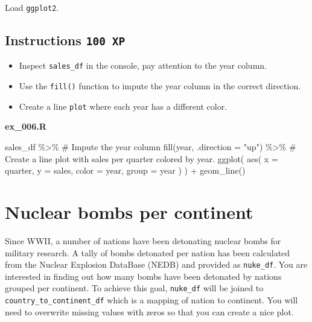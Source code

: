 \documentclass[
  letterpaper,
  DIV=11,
  numbers=noendperiod]{scrreprt}
\newenvironment{Shaded}{\begin{snugshade}}{\end{snugshade}}
\newcommand{\AttributeTok}[1]{\textcolor[rgb]{0.40,0.45,0.13}{#1}}
\newcommand{\CommentTok}[1]{\textcolor[rgb]{0.37,0.37,0.37}{#1}}
\newcommand{\FunctionTok}[1]{\textcolor[rgb]{0.28,0.35,0.67}{#1}}
\newcommand{\NormalTok}[1]{\textcolor[rgb]{0.00,0.23,0.31}{#1}}
\newcommand{\SpecialCharTok}[1]{\textcolor[rgb]{0.37,0.37,0.37}{#1}}
\newcommand{\StringTok}[1]{\textcolor[rgb]{0.13,0.47,0.30}{#1}}
\providecommand{\tightlist}{%
  \setlength{\itemsep}{0pt}\setlength{\parskip}{0pt}}\usepackage{longtable,booktabs,array}
\begin{document}
Load \texttt{ggplot2}.

\hypertarget{instructions-100-xp-5}{%
\subsection*{\texorpdfstring{Instructions
\texttt{100\ XP}}{Instructions 100 XP}}\label{instructions-100-xp-5}}

\begin{itemize}
\tightlist
\item
  Inspect \texttt{sales\_df} in the console, pay attention to the year
  column.
\item
  Use the \texttt{fill()} function to impute the year column in the
  correct direction.
\item
  Create a line \texttt{plot} where each year has a different color.
\end{itemize}

\textbf{ex\_006.R}

\begin{Shaded}
\begin{Highlighting}[]
\NormalTok{sales\_df }\SpecialCharTok{\%\textgreater{}\%} 
  \CommentTok{\# Impute the year column}
  \FunctionTok{fill}\NormalTok{(year, }\AttributeTok{.direction =} \StringTok{"up"}\NormalTok{) }\SpecialCharTok{\%\textgreater{}\%}
  \CommentTok{\# Create a line plot with sales per quarter colored by year.}
  \FunctionTok{ggplot}\NormalTok{(}
    \FunctionTok{aes}\NormalTok{(}
      \AttributeTok{x =}\NormalTok{ quarter,}
      \AttributeTok{y =}\NormalTok{ sales,}
      \AttributeTok{color =}\NormalTok{ year,}
      \AttributeTok{group =}\NormalTok{ year}
\NormalTok{    )}
\NormalTok{  ) }\SpecialCharTok{+}
  \FunctionTok{geom\_line}\NormalTok{()}
\end{Highlighting}
\end{Shaded}

\hypertarget{nuclear-bombs-per-continent}{%
\section{Nuclear bombs per
continent}\label{nuclear-bombs-per-continent}}

Since WWII, a number of nations have been detonating nuclear bombs for
military research. A tally of bombs detonated per nation has been
calculated from the Nuclear Explosion DataBase (NEDB) and provided as
\texttt{nuke\_df}. You are interested in finding out how many bombs have
been detonated by nations grouped per continent. To achieve this goal,
\texttt{nuke\_df} will be joined to \texttt{country\_to\_continent\_df}
which is a mapping of nation to continent. You will need to overwrite
missing values with zeros so that you can create a nice plot.
\end{document}
